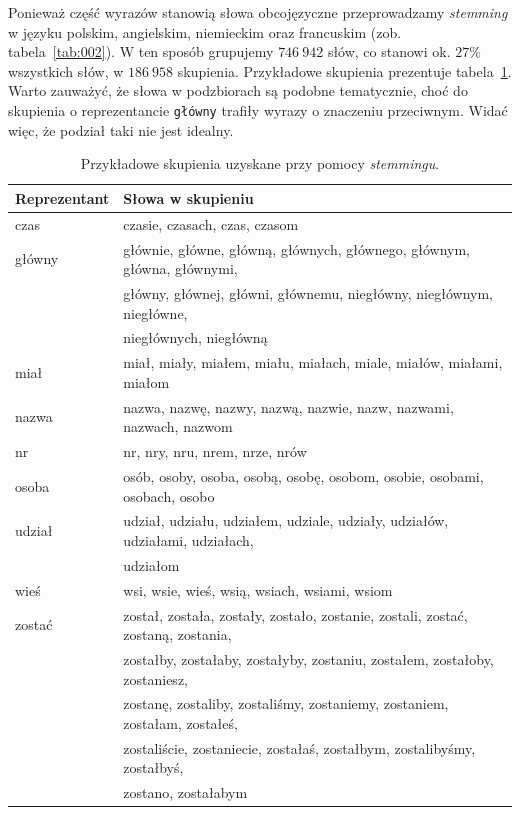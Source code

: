 \documentclass{praca1}
\begin{document}
Ponieważ część wyrazów stanowią słowa obcojęzyczne przeprowadzamy \emph{stemming} w języku polskim, angielskim, niemieckim oraz francuskim (zob. tabela~\ref{tab:002}). W ten sposób grupujemy $746\ 942$ słów, co stanowi ok. $27\%$ wszystkich słów, w $186\ 958$ skupienia. Przykładowe skupienia prezentuje tabela~\ref{tab:003}. Warto zauważyć, że słowa w podzbiorach są podobne tematycznie, choć do skupienia o reprezentancie \verb|główny| trafiły wyrazy o znaczeniu przeciwnym. Widać więc, że podział taki nie jest idealny.

\begin{table}[!h]
\centering
\begin{tabular}{|l|l|}
  \hline
Reprezentant & Słowa w skupieniu \\ \hline
  \hline
czas & czasie, czasach, czas, czasom \\ \hline
  główny & głównie, główne, główną, głównych, głównego, głównym, główna, głównymi, \\
& główny, głównej, główni, głównemu, niegłówny, niegłównym, niegłówne, \\
& niegłównych, niegłówną \\ \hline
  miał & miał, miały, miałem, miału, miałach, miale, miałów, miałami, miałom \\ \hline
  nazwa & nazwa, nazwę, nazwy, nazwą, nazwie, nazw, nazwami, nazwach, nazwom \\ \hline
  nr & nr, nry, nru, nrem, nrze, nrów \\ \hline
  osoba & osób, osoby, osoba, osobą, osobę, osobom, osobie, osobami, osobach, osobo \\ \hline
  udział & udział, udziału, udziałem, udziale, udziały, udziałów, udziałami, udziałach, \\
& udziałom \\ \hline
  wieś & wsi, wsie, wieś, wsią, wsiach, wsiami, wsiom \\ \hline
  zostać & został, została, zostały, zostało, zostanie, zostali, zostać, zostaną, zostania, \\
& zostałby, zostałaby, zostałyby, zostaniu, zostałem, zostałoby, zostaniesz,\\
& zostanę, zostaliby, zostaliśmy, zostaniemy, zostaniem, zostałam, zostałeś, \\ 
& zostaliście, zostaniecie, zostałaś, zostałbym, zostalibyśmy, zostałbyś, \\
& zostano, zostałabym \\ 
   \hline
\end{tabular}
\caption{Przykładowe skupienia uzyskane przy pomocy \emph{stemmingu}.}
\label{tab:003}
\end{table}
\end{document}
